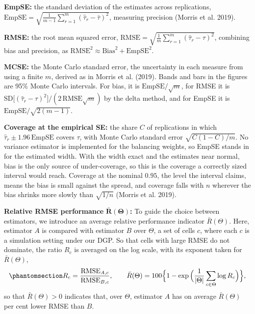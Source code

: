 \documentclass[
  12pt,
  a4paper,
]{article}
\begin{document}
\textbf{EmpSE:} the standard deviation of the estimates across
replications,
\(\mathrm{EmpSE} = \sqrt{\frac{1}{m-1}\sum_{r=1}^{m}(\hat\tau_r - \bar\tau)^2}\),
measuring precision (Morris et al. 2019).

\textbf{RMSE:} the root mean squared error,
\(\mathrm{RMSE} = \sqrt{\frac{1}{m}\sum_{r=1}^{m}(\hat\tau_r - \tau)^2}\),
combining bias and precision, as
\(\mathrm{RMSE}^2 \approx \mathrm{Bias}^2 + \mathrm{EmpSE}^2\).

\textbf{MCSE:} the Monte Carlo standard error, the uncertainty in each
measure from using a finite \(m\), derived as in Morris et al. (2019).
Bands and bars in the figures are 95\% Monte Carlo intervals. For bias,
it is \(\mathrm{EmpSE}/\sqrt{m}\), for RMSE it is
\(\mathrm{SD}\big[(\hat\tau_r - \tau)^2\big]/(2\,\mathrm{RMSE}\sqrt{m})\)
by the delta method, and for EmpSE it is
\(\mathrm{EmpSE}/\sqrt{2(m-1)}\).

\textbf{Coverage at the empirical SE:} the share \(C\) of replications
in which \(\hat\tau_r \pm 1.96\,\mathrm{EmpSE}\) covers \(\tau\), with
Monte Carlo standard error \(\sqrt{C(1 - C)/m}\). No variance estimator
is implemented for the balancing weights, so EmpSE stands in for the
estimated width. With the width exact and the estimates near normal,
bias is the only source of under-coverage, so this is the coverage a
correctly sized interval would reach. Coverage at the nominal \(0.95\),
the level the interval claims, means the bias is small against the
spread, and coverage falls with \(n\) wherever the bias shrinks more
slowly than \(\sqrt{1/n}\) (Morris et al. 2019).

\textbf{Relative RMSE performance}
\(\boldsymbol{\bar R(\Theta)}\)\textbf{:} To guide the choice between
estimators, we introduce an average relative performance indicator
\(\bar R(\Theta)\). Here, estimator \(A\) is compared with estimator
\(B\) over \(\Theta\), a set of cells \(c\), where each \(c\) is a
simulation setting under our DGP. So that cells with large RMSE do not
dominate, the ratio \(R_c\) is averaged on the log scale, with its
exponent taken for \(\bar R(\Theta)\),
\begin{equation}\protect\phantomsection\label{eq-rbar}{R_c = \frac{\mathrm{RMSE}_{A,c}}{\mathrm{RMSE}_{B,c}}, \qquad \bar R(\Theta) = 100\Big\{1 - \exp\Big(\frac{1}{|\Theta|} \sum_{c \in \Theta} \log R_c\Big)\Big\},}\end{equation}
so that \(\bar R(\Theta) > 0\) indicates that, over \(\Theta\),
estimator \(A\) has on average \(\bar R(\Theta)\) per cent lower RMSE
than \(B\).
\end{document}
